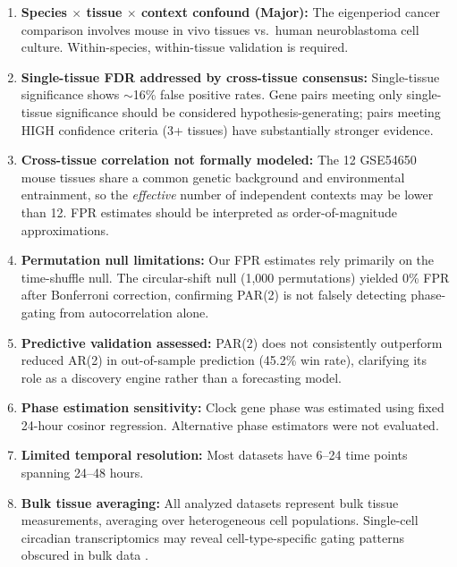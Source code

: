 \documentclass[11pt,a4paper]{article}
\begin{document}
\begin{enumerate}
    \item \textbf{Species $\times$ tissue $\times$ context confound (Major):} The eigenperiod cancer comparison involves mouse in vivo tissues vs.\ human neuroblastoma cell culture. Within-species, within-tissue validation is required.
    
    \item \textbf{Single-tissue FDR addressed by cross-tissue consensus:} Single-tissue significance shows $\sim$16\% false positive rates. Gene pairs meeting only single-tissue significance should be considered hypothesis-generating; pairs meeting HIGH confidence criteria (3+ tissues) have substantially stronger evidence.
    
    \item \textbf{Cross-tissue correlation not formally modeled:} The 12 GSE54650 mouse tissues share a common genetic background and environmental entrainment, so the \textit{effective} number of independent contexts may be lower than 12. FPR estimates should be interpreted as order-of-magnitude approximations.
    
    \item \textbf{Permutation null limitations:} Our FPR estimates rely primarily on the time-shuffle null. The circular-shift null (1,000 permutations) yielded 0\% FPR after Bonferroni correction, confirming PAR(2) is not falsely detecting phase-gating from autocorrelation alone.
    
    \item \textbf{Predictive validation assessed:} PAR(2) does not consistently outperform reduced AR(2) in out-of-sample prediction (45.2\% win rate), clarifying its role as a discovery engine rather than a forecasting model.
    
    \item \textbf{Phase estimation sensitivity:} Clock gene phase was estimated using fixed 24-hour cosinor regression. Alternative phase estimators were not evaluated.
    
    \item \textbf{Limited temporal resolution:} Most datasets have 6--24 time points spanning 24--48 hours.
    
    \item \textbf{Bulk tissue averaging:} All analyzed datasets represent bulk tissue measurements, averaging over heterogeneous cell populations. Single-cell circadian transcriptomics may reveal cell-type-specific gating patterns obscured in bulk data \citep{droin2019space}.
    

\end{enumerate}
\end{document}
